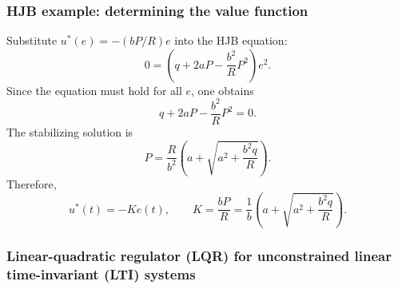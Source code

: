 \begin{frame}
	\frametitle{HJB example: determining the value function}
	Substitute $u^*(e)=-(bP/R)e$ into the HJB equation:
	\begin{equation*}
		0=\left(q+2aP-\frac{b^2}{R}P^2\right)e^2 .
	\end{equation*}\pause%
	Since the equation must hold for all $e$, one obtains
	\begin{equation*}
		q+2aP-\frac{b^2}{R}P^2=0 .
	\end{equation*}\pause%
	The stabilizing solution is
	\begin{equation*}
		P=\frac{R}{b^2}\left(a+\sqrt{a^2+\frac{b^2q}{R}}\right).
	\end{equation*}\pause%
	Therefore,
	\begin{equation*}
		\boxed{u^*(t)=-K e(t),\qquad K=\frac{bP}{R}=\frac{1}{b}\left(a+\sqrt{a^2+\frac{b^2q}{R}}\right).}
	\end{equation*}
\end{frame}

\subsubsection{Linear-quadratic regulator (LQR) for unconstrained linear time-invariant (LTI) systems}


